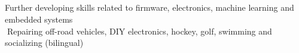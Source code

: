 \documentclass[mm]{res}
\begin{document}
\begin{resume}
%



\toprule

\section{\headinginterests}
\tb Further developing skills related to firmware, electronics, machine learning and embedded systems\\
􏰚\tb Repairing off-road vehicles, DIY electronics, hockey, golf, swimming and socializing (bilingual)

\end{resume}
\end{document}
